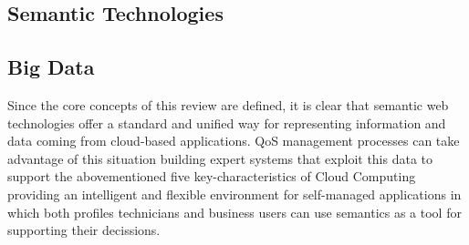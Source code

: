 \subsection{Semantic Technologies}

\subsection{Big Data}



Since the core concepts of this review are defined, it is clear that semantic 
web technologies offer a standard and unified way for representing information 
and data coming from cloud-based applications. QoS management processes can 
take advantage of this situation building expert systems that exploit this data to support the abovementioned five 
key-characteristics of Cloud Computing providing an intelligent and flexible environment for 
self-managed applications in which both profiles technicians and business users can use 
semantics as a tool for supporting their decissions.
